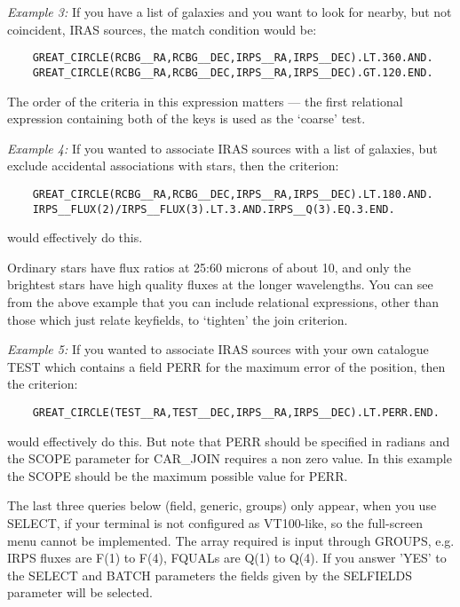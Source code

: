 {\em Example 3:} If you have a list of galaxies and you want to look for
nearby, but not coincident, IRAS sources, the match condition would be:
\begin{verbatim}
    GREAT_CIRCLE(RCBG__RA,RCBG__DEC,IRPS__RA,IRPS__DEC).LT.360.AND.
    GREAT_CIRCLE(RCBG__RA,RCBG__DEC,IRPS__RA,IRPS__DEC).GT.120.END.
\end{verbatim}
The order of the criteria in this expression matters --- the first relational
expression containing both of the keys is used as the `coarse' test.

{\em Example 4:} If you wanted to associate IRAS sources with a list of
galaxies,  but exclude accidental associations with stars, then the criterion:
\begin{verbatim}
    GREAT_CIRCLE(RCBG__RA,RCBG__DEC,IRPS__RA,IRPS__DEC).LT.180.AND.
    IRPS__FLUX(2)/IRPS__FLUX(3).LT.3.AND.IRPS__Q(3).EQ.3.END.
\end{verbatim}
would effectively do this.

Ordinary stars have flux ratios at 25:60 microns of about 10, and only the
brightest stars have high quality fluxes at the longer wavelengths.
You can see from the above example that you can include relational expressions,
other than those which just relate keyfields, to `tighten' the join criterion.

{\em Example 5:} If you wanted to associate IRAS sources with your own
catalogue TEST which contains a field PERR for the maximum error of the
position, then the criterion:
\begin{verbatim}
    GREAT_CIRCLE(TEST__RA,TEST__DEC,IRPS__RA,IRPS__DEC).LT.PERR.END.
\end{verbatim}
would effectively do this. But note that PERR should be specified in radians
and the SCOPE parameter for CAR\_JOIN requires a non zero value. In this example
the SCOPE should be the maximum possible value for PERR.

The last three queries below (field, generic, groups) only appear, when you use
SELECT, if your terminal is not configured as VT100-like, so the full-screen
menu cannot be implemented.
The array required is input through GROUPS, e.g. IRPS fluxes are F(1) to
F(4), FQUALs are Q(1) to Q(4).
If you answer 'YES' to the SELECT and BATCH parameters the fields given by the
SELFIELDS parameter will be selected.

